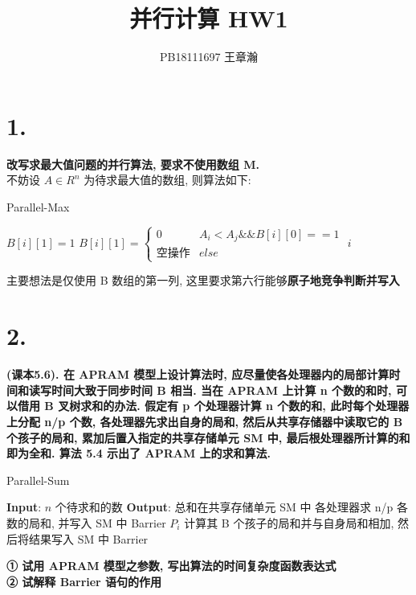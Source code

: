 \documentclass[UTF8]{article}
\title{并行计算 HW1}
\author{PB18111697 王章瀚}
\newcommand{\ceil}[1]{\lceil#1\rceil}
\begin{document}
\maketitle
\section*{1.}
\noindent 
\textbf{改写求最大值问题的并行算法, 要求不使用数组 M.}\\

\noindent 不妨设 $A\in R^n$ 为待求最大值的数组, 则算法如下:
\begin{algorithm}[H]
	\caption{Parallel-Max}
	\begin{algorithmic}[1] %
	 
		\State $B[i][1]=1$
	\EndFor	
	 
				\State $B[i][1]=\left\{
				\begin{array}{ll}
				0 & A_i<A_j \&\& B[i][0] == 1\\ 
				\mbox{空操作} & else
				\end{array}\right.$ 
			\EndIf
		\EndFor
	\EndFor
	 
			\State \Return $i$
		\EndIf
	\EndFor	
	\end{algorithmic}
\end{algorithm}

\noindent 主要想法是仅使用 B 数组的第一列, 这里要求第六行能够\textbf{原子地竞争判断并写入}

\newpage
\section*{2.}
\noindent \textbf{(课本5.6). 在 APRAM 模型上设计算法时, 应尽量使各处理器内的局部计算时间和读写时间大致于同步时间 B 相当. 当在 APRAM 上计算 n 个数的和时, 可以借用 B 叉树求和的办法. 假定有 p 个处理器计算 n 个数的和, 此时每个处理器上分配 n/p 个数, 各处理器先求出自身的局和, 然后从共享存储器中读取它的 B 个孩子的局和, 累加后置入指定的共享存储单元 SM 中, 最后根处理器所计算的和即为全和. 算法 5.4 示出了 APRAM 上的求和算法.}

\begin{algorithm}[H]
	\caption{Parallel-Sum}
	\begin{algorithmic}[1] %
	\State \textbf{Input}: $n$ 个待求和的数
	\State \textbf{Output}: 总和在共享存储单元 SM 中
	\State 各处理器求 n/p 各数的局和, 并写入 SM 中
	\State Barrier
	\For {$k=\ceil{\log_B(p(B-1)+1)}-2$ downto 0}
				\State $P_i$ 计算其 B 个孩子的局和并与自身局和相加, 然后将结果写入 SM 中
				\State Barrier
			\EndIf
		\EndFor
	\EndFor
	\end{algorithmic}
\end{algorithm}
\noindent \textbf{① 试用 APRAM 模型之参数, 写出算法的时间复杂度函数表达式\\
② 试解释 Barrier 语句的作用\\}
\end{document}
